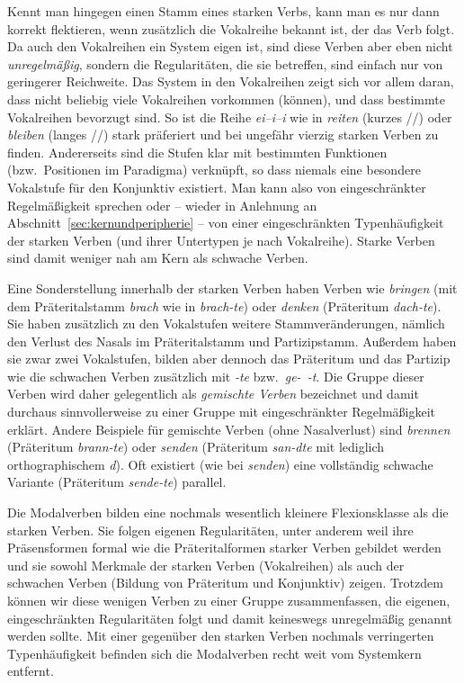 Kennt man hingegen einen Stamm eines starken Verbs, kann man es nur dann korrekt flektieren, wenn zusätzlich die Vokalreihe bekannt ist, der das Verb folgt.
Da auch den Vokalreihen ein System eigen ist, sind diese Verben aber eben nicht \textit{unregelmäßig}, sondern die Regularitäten, die sie betreffen, sind einfach nur von geringerer Reichweite.
Das System in den Vokalreihen zeigt sich vor allem daran, dass nicht beliebig viele Vokalreihen vorkommen (können), und dass bestimmte Vokalreihen bevorzugt sind.
So ist \zB die Reihe \textit{ei--i--i} wie in \textit{reiten} (kurzes //) oder \textit{bleiben} (langes //) stark präferiert und bei ungefähr vierzig starken Verben zu finden.
Andererseits sind die Stufen klar mit bestimmten Funktionen (bzw.\ Positionen im Paradigma) verknüpft, so dass \zB niemals eine besondere Vokalstufe für den Konjunktiv existiert.
Man kann also von eingeschränkter Regelmäßigkeit sprechen oder -- wieder in Anlehnung an Abschnitt~\ref{sec:kernundperipherie} -- von einer eingeschränkten Typenhäufigkeit der starken Verben (und ihrer Untertypen je nach Vokalreihe).
Starke Verben sind damit weniger nah am Kern als schwache Verben.

Eine Sonderstellung innerhalb der starken Verben haben Verben wie \textit{bringen} (mit dem Präteritalstamm \textit{brach} wie in \textit{brach-te}) oder \textit{denken} (Präteritum \textit{dach-te}).
Sie haben zusätzlich zu den Vokalstufen weitere Stammveränderungen, nämlich den Verlust des Nasals im Präteritalstamm und Partizipstamm.
Außerdem haben sie zwar zwei Vokalstufen, bilden aber dennoch das Präteritum und das Partizip wie die schwachen Verben zusätzlich mit \textit{-te} bzw.\ \textit{ge-~-t}.
Die Gruppe dieser Verben wird daher gelegentlich als \textit{gemischte Verben} bezeichnet und damit durchaus sinnvollerweise zu einer Gruppe mit eingeschränkter Regelmäßigkeit erklärt.
Andere Beispiele für gemischte Verben (ohne Nasalverlust) sind \textit{brennen} (Präteritum \textit{brann-te}) oder \textit{senden} (Präteritum \textit{san-dte} mit lediglich orthographischem \textit{d}).
Oft existiert (wie bei \textit{senden}) eine vollständig schwache Variante (Präteritum \textit{sende-te}) parallel.

Die Modalverben bilden eine nochmals wesentlich kleinere Flexionsklasse als die starken Verben.
Sie folgen eigenen Regularitäten, unter anderem weil ihre Präsensformen formal wie die Präteritalformen starker Verben gebildet werden und sie sowohl Merkmale der starken Verben (Vokalreihen) als auch der schwachen Verben (Bildung von Präteritum und Konjunktiv) zeigen.
Trotzdem können wir diese wenigen Verben zu einer Gruppe zusammenfassen, die eigenen, eingeschränkten Regularitäten folgt und damit keineswegs unregelmäßig genannt werden sollte.
Mit einer gegenüber den starken Verben nochmals verringerten Typenhäufigkeit befinden sich die Modalverben recht weit vom Systemkern entfernt.

